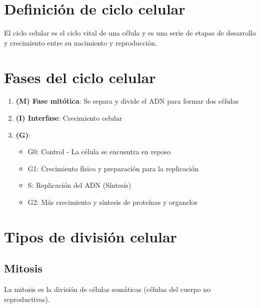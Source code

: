 \section{Definición de ciclo celular}

El ciclo celular es el ciclo vital de una célula y es una serie de etapas de desarrollo y crecimiento entre su nacimiento y reproducción.

\section{Fases del ciclo celular}

\begin{enumerate}
    \item \textbf{(M) Fase mitótica}: Se separa y divide el ADN para formar dos células
    \item \textbf{(I) Interfase}: Crecimiento celular
    \item \textbf{(G)}:
        \begin{itemize}
            \item G0: Control - La célula se encuentra en reposo
            \item G1: Crecimiento físico y preparación para la replicación
            \item S: Replicación del ADN (Síntesis)
            \item G2: Más crecimiento y síntesis de proteínas y organelos
        \end{itemize}
\end{enumerate}

\section{Tipos de división celular}

\subsection{Mitosis}
La mitosis es la división de células somáticas (células del cuerpo no reproductivas).

